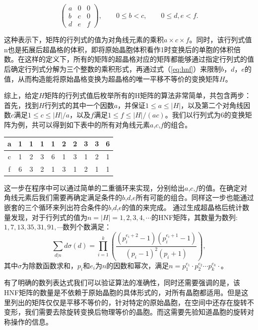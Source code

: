 \begin{equation}\label{eq:hnf}
  \begin{pmatrix}
    a & 0 & 0 \\
    b & c & 0 \\
    d & e & f
  \end{pmatrix}, \qquad
  0\leq b < c, \qquad
  0\leq d, e< f.
\end{equation}

这种表示下，矩阵的行列式的值为对角线元素的乘积$a\times c \times f$。同时，该行列式值n也是拓展后超晶格的体积，即将原始晶胞体积看作1时变换后的单胞的体积倍数。在这样的定义下，所有的矩阵的超晶格对应的矩阵都能够通过指定行列式的值后确定行列式分解为三个整数的乘积形式，再通过式（\ref{eq:hnf}）来限制$b$，$d$，$e$的值，从而构造能将原始晶格变换为超晶格的唯一平移不等价的变换矩阵$H$。

综上，给定$H$矩阵的行列式值后枚举所有的H矩阵的算法非常简单，共包含两步：首先，找到$H$行列式的其中一个因数$a$，并保证$1\leq a \leq |H|$，以及第二个对角线因数$c$满足$1\leq c\leq |H|/a$，以及$f$满足$1\leq f\leq |H|/(ac)$。我们以行列式为\num{6}的变换矩阵为例，共可以得到如下表中的所有对角线元素$a$,$c$,$f$的组合。

\begin{table}
  \centering
  \begin{tabular}{c|ccccccccc}
    a & 1 & 1 & 1 & 1 & 2 & 2 & 3 & 3 & 6 \\
    \hline
    c & 1 & 2 & 3 & 6 & 1 & 3 & 1 & 2 & 1 \\
    \hline
    f & 6 & 3 & 2 & 1 & 3 & 1 & 2 & 1 & 1 \\
  \end{tabular}
\end{table}

这一步在程序中可以通过简单的二重循环来实现，分别给出$a$,$c$,$f$的值。在确定对角线元素后我们需要再确定满足条件的$b$,$d$,$e$所有可能的组合。同样这一步也能通过嵌套的三个循环来列出符合条件的$b$,$d$,$e$的值的来完成。
通过生成超晶格后统计数量发现，对于行列式的值为$n=|H|=1,2,3,4,\cdots$的HNF矩阵，其数量为数列:$1,7,13,35,31,91,\cdots$数列个数满足：
\begin{equation}
  \sum_{d|n} d\sigma(d) = \prod^k_{i=1}\left( {\frac{(p_i^{e_i + 2}-1)(p_i^{e_i + 1}-1)}{(p_i-1)^2(p_i+1)}} \right),
\end{equation}
其中$\sigma$为除数函数求和\cite{erdiis1952distribution}，$p_i$和$e_i$为$n$的因数和幂次，满足$n=p_1^{e_1}\cdot p_2^{e_2}\cdots p_k^{e_k}\cdot$。

有了明确的数列表达式我们可以验证算法的准确性，同时还需要强调的是，该HNF矩阵的数量是不依赖于原始晶胞的具体形式的，对所有晶胞都适用。但是这里列出的矩阵仅仅是平移不等价的，针对特定的原始晶胞，在空间中还存在旋转不变形，我们需要去除旋转变换后物理等价的晶胞。而这需要先验知道晶胞的旋转对称操作的信息。

